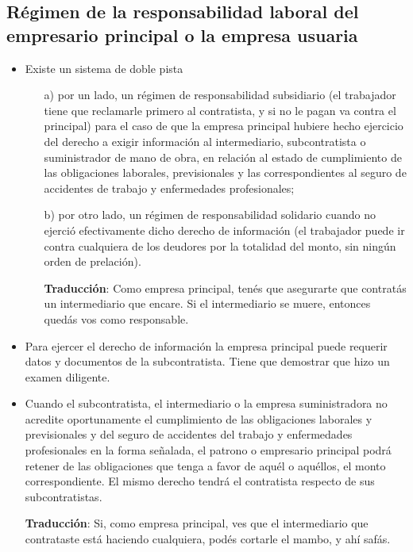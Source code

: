 \documentclass[spanish,12pt,a4paper,titlepage]{report}
\begin{document}
\subsection{Régimen de la responsabilidad laboral del empresario principal o la empresa usuaria}

\begin{itemize}

\item Existe un sistema de doble pista\begin{enumerate}
\item[a)] por un lado, un régimen de responsabilidad subsidiario (el trabajador tiene que reclamarle primero al contratista, y si no le pagan va contra el principal) para el caso de que la empresa principal hubiere hecho ejercicio del derecho a exigir información al intermediario, subcontratista o suministrador de mano de obra, en relación al estado de cumplimiento de las obligaciones laborales, previsionales y las correspondientes al seguro de accidentes de trabajo y enfermedades profesionales;

\item[b)] por otro lado, un régimen de responsabilidad solidario  cuando no ejerció efectivamente dicho derecho de información (el trabajador puede ir contra cualquiera de los deudores por la totalidad del monto, sin ningún orden de prelación).

\textbf{Traducción}: Como empresa principal, tenés que asegurarte que contratás un intermediario que encare. Si el intermediario se muere, entonces quedás vos como responsable.

\end{enumerate} 



\item Para ejercer el derecho de información la empresa principal puede requerir datos y documentos de la subcontratista. Tiene que demostrar que hizo un examen diligente. 

\item Cuando el subcontratista, el intermediario o la empresa suministradora no acredite oportunamente el cumplimiento de las obligaciones laborales y previsionales y del seguro de accidentes del trabajo y enfermedades profesionales en la forma señalada, el patrono o empresario principal podrá retener de las obligaciones que tenga a favor de aquél o aquéllos, el monto correspondiente. El mismo derecho tendrá el contratista respecto de sus subcontratistas.

\textbf{Traducción}: Si, como empresa principal, ves que el intermediario que contrataste está haciendo cualquiera, podés cortarle el mambo, y ahí safás.

\end{itemize}
\end{document}
